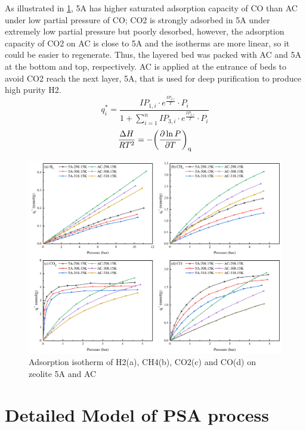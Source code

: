 \documentclass[preprint,12pt]{elsarticle}
\begin{document}
	As illustrated in  \cref{FIG:1}, 5A has higher saturated adsorption capacity of CO than AC under low partial pressure of CO; CO2 is strongly adsorbed in 5A under extremely low partial pressure but poorly desorbed, however, the adsorption capacity of CO2 on AC is close to 5A and the isotherms are more linear, so it could be easier to regenerate. Thus, the layered bed was packed with AC and 5A at the bottom and top, respectively. AC is applied at the entrance of beds to avoid CO2 reach the next layer, 5A, that is used for deep purification to produce high purity H2.
	\begin{equation}
		q_i^* = \frac{{I{P_{1,i}} \cdot {e^{\frac{{I{P_{2,i}}}}{T}}} \cdot {P_i}}}{{1 + \sum\limits_{i = 1}^n I {P_{3,i}} \cdot {e^{\frac{{I{P_{4,i}}}}{T}}} \cdot {P_i}}}\label{EXLang2}
	\end{equation}	 
	 \begin{equation}
	 	\frac{{\Delta H}}{{R{T^2}}} =  - {\left( {\frac{{\partial \ln P}}{{\partial T}}} \right)_{\rm{q}}}\label{CC}
	 \end{equation}
	\begin{figure}
		\centering
		\includegraphics[width=1\textwidth]{figs/Fig1.pdf}
		\caption{Adsorption isotherm of H2(a), CH4(b), CO2(c) and CO(d) on zeolite 5A and AC}
		\label{FIG:1}
	\end{figure}
	\section{Detailed Model of PSA process}
\end{document}
